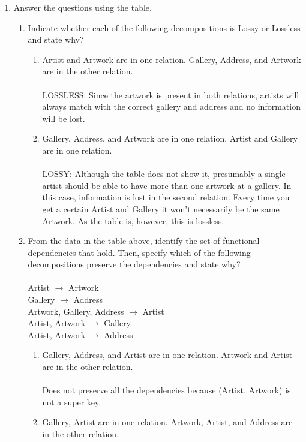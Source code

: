 \documentclass[12pt]{article}
\begin{document}
\begin{enumerate}
\newpage

\item Answer the questions using the table.
  \begin{enumerate}
  \item Indicate whether each of the following decompositions is Lossy or Lossless and state why? 
    \begin{enumerate}
    \item Artist and Artwork are in one relation. Gallery, Address, and Artwork are in the other relation. \\ \\
      LOSSLESS: Since the artwork is present in both relations, artists will always match with the correct gallery and address and no information will be lost. 
      
    \item Gallery, Address, and Artwork are in one relation. Artist and Gallery are in one relation. \\ \\
      LOSSY: Although the table does not show it, presumably a single artist should be able to have more than one artwork at a gallery. In this case, information is lost in the second relation. Every time you get a certain Artist and Gallery it won't necessarily be the same Artwork. As the table is, however, this is lossless.
      
    \end{enumerate}
  \item From the data in the table above, identify the set of functional dependencies that hold. Then, specify which of the following decompositions preserve the dependencies and state why? \\ \\
    Artist $\to$ Artwork \\
    Gallery $\to$ Address \\
    Artwork, Gallery, Address $\to$ Artist \\
    Artist, Artwork $\to$ Gallery \\
    Artist, Artwork $\to$ Address \\
    \begin{enumerate}
    \item Gallery, Address, and Artist are in one relation. Artwork and Artist are in the other relation. \\ \\
      Does not preserve all the dependencies because (Artist, Artwork) is not a super key.
    \item Gallery, Artist are in one relation. Artwork, Artist, and Address are in the other relation. \\ \\ 
    \end{enumerate}
  \end{enumerate}

\end{enumerate}
\end{document}
